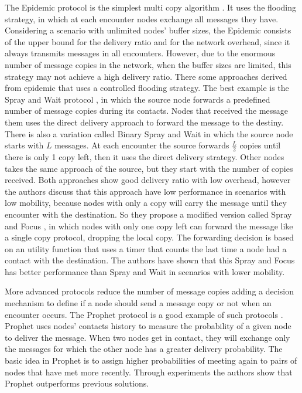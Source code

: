 The Epidemic protocol is the simplest multi copy algorithm \cite{vahdat2000epidemic}. It uses the flooding strategy, in which at each encounter nodes exchange all messages they have.
Considering a scenario with unlimited nodes' buffer sizes, the Epidemic consists of the upper bound for the delivery ratio and for the network overhead, since it always transmits
messages in all encounters. However, due to the enormous number of message copies in the network, when the buffer sizes are limited, this strategy may not achieve a high delivery ratio.
There some approaches derived from epidemic that uses a controlled flooding strategy. The best example is the Spray and Wait protocol \cite{spyropoulos2005spray}, in which the source node forwards a predefined
number of message copies during its contacts. Nodes that received the message them uses the direct delivery approach to forward the message to the destiny. There is also a variation called Binary Spray and Wait \cite{spyropoulos2005spray} in which
the source node starts with $L$ messages. At each encounter the source forwards $\frac{L}{2}$ copies until there is only 1 copy left, then it uses the direct delivery strategy. Other nodes
takes the same approach of the source, but they start with the number of copies received. Both approaches show good delivery ratio with low overhead, however the authors discuss that
this approach have low performance in scenarios with low mobility, because nodes with only a copy will carry the message until they encounter with the destination. So they propose a
modified version called Spray and Focus \cite{spyropoulos2007spray}, in which nodes with only one copy left can forward the message like a single copy protocol, dropping the local copy.
The forwarding decision is based on an utility function that uses a timer that counts the last time a node had a contact with the destination. The authors have shown that this Spray and Focus
has better performance than Spray and Wait in scenarios with lower mobility.

More advanced protocols reduce the number of message copies adding a decision mechanism to define if a node should send a message copy or not when an encounter occurs. The Prophet protocol
is a good example of such protocols \cite{lindgren2003probabilistic}. Prophet uses nodes' contacts history to measure the probability of a given node to deliver the message. When two nodes
get in contact, they will exchange only the messages for which the other node has a greater delivery probability. The basic idea in Prophet is to assign higher probabilities of meeting
again to pairs of nodes that have met more recently. Through experiments the authors show that Prophet outperforms previous solutions.


